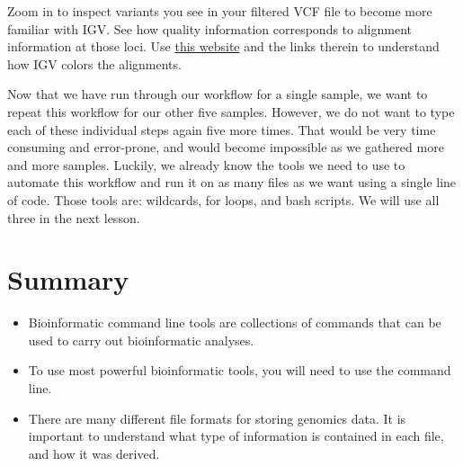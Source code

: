 \documentclass[
  letterpaper,
  DIV=11,
  numbers=noendperiod]{scrreprt}
\providecommand{\tightlist}{%
  \setlength{\itemsep}{0pt}\setlength{\parskip}{0pt}}\usepackage{longtable,booktabs,array}
\begin{document}
Zoom in to inspect variants you see in your filtered VCF file to become
more familiar with IGV. See how quality information corresponds to
alignment information at those loci. Use
\href{http://software.broadinstitute.org/software/igv/AlignmentData}{this
website} and the links therein to understand how IGV colors the
alignments.

Now that we have run through our workflow for a single sample, we want
to repeat this workflow for our other five samples. However, we do not
want to type each of these individual steps again five more times. That
would be very time consuming and error-prone, and would become
impossible as we gathered more and more samples. Luckily, we already
know the tools we need to use to automate this workflow and run it on as
many files as we want using a single line of code. Those tools are:
wildcards, for loops, and bash scripts. We will use all three in the
next lesson.

\hypertarget{summary-3}{%
\section{Summary}\label{summary-3}}

\begin{tcolorbox}[enhanced jigsaw, toptitle=1mm, breakable, bottomrule=.15mm, colback=white, toprule=.15mm, opacityback=0, bottomtitle=1mm, coltitle=black, opacitybacktitle=0.6, rightrule=.15mm, colframe=quarto-callout-important-color-frame, titlerule=0mm, colbacktitle=quarto-callout-important-color!10!white, title=\textcolor{quarto-callout-important-color}{\faExclamation}\hspace{0.5em}{Key points}, left=2mm, leftrule=.75mm, arc=.35mm]

\begin{itemize}
\tightlist
\item
  Bioinformatic command line tools are collections of commands that can
  be used to carry out bioinformatic analyses.
\item
  To use most powerful bioinformatic tools, you will need to use the
  command line.
\item
  There are many different file formats for storing genomics data. It is
  important to understand what type of information is contained in each
  file, and how it was derived.
\end{itemize}

\end{tcolorbox}

\end{document}
